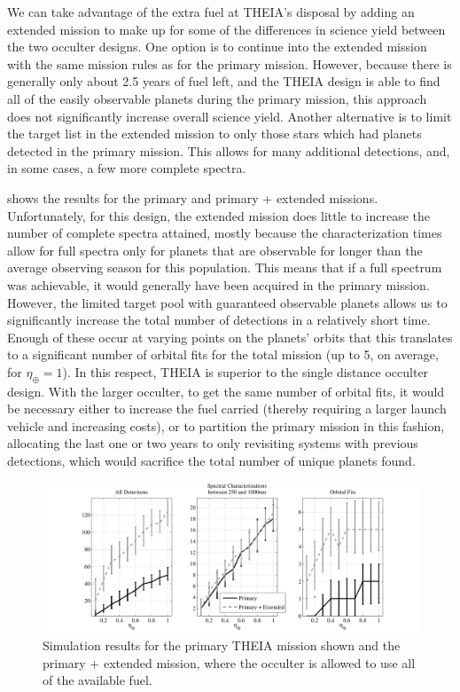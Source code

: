 We can take advantage of the extra fuel at THEIA's disposal by adding an extended mission to make up for some of the differences in science yield between the two occulter designs.  One option is to continue into the extended mission with the same mission rules as for the primary mission.  However, because there is generally only about 2.5 years of fuel left, and the THEIA design is able to find all of the easily observable planets during the primary mission, this approach does not significantly increase overall science yield.  Another alternative is to limit the target list in the extended mission to only those stars which had planets detected in the primary mission.  This allows for many additional detections, and, in some cases, a few more complete spectra.  

 shows the results for the primary and primary + extended missions.  Unfortunately, for this design, the extended mission does little to increase the number of complete spectra attained, mostly because the characterization times allow for full spectra only for planets that are observable for longer than the average observing season for this population.  This means that if a full spectrum was achievable, it would generally have been acquired in the primary mission.  However, the limited target pool with guaranteed observable planets allows us to significantly increase the total number of detections in a relatively short time.  Enough of these occur at varying points on the planets' orbits that this translates to a significant number of orbital fits for the total mission (up to 5, on average, for $\eta_\oplus = 1$).  In this respect, THEIA is superior to the single distance occulter design.  With the larger occulter, to get the same number of orbital fits, it would be  necessary either to increase the fuel carried (thereby requiring a larger launch vehicle and increasing costs), or to partition the primary mission in this fashion, allocating the last one or two years to only revisiting systems with previous detections, which would sacrifice the total number of unique planets found.

\begin{figure}[ht]
\centering
 \includegraphics[width=6in,clip=true,trim=0.8in 0in 0.75in 0in]{./figures/theiaExt} 
 \caption[THEIA Extended Mission]{ \label{fig:theia_ext} Simulation results for the primary THEIA mission shown and the primary + extended mission, where the occulter is allowed to use all of the available fuel.} 
 \end{figure}
 
